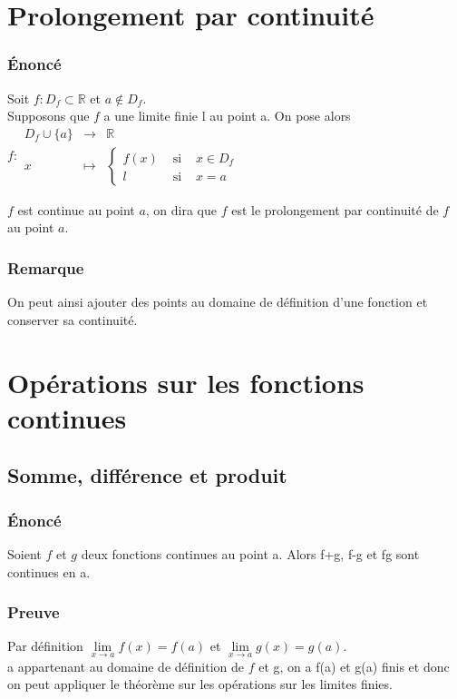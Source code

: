 \documentclass[a4paper,10pt]{book} %
\newcommand{\R}{\mathbb{R}}
\begin{document}
\newpage

\section{Prolongement par continuité}
\subsubsection{Énoncé}
Soit $f:D_{f}\subset \R$ et $a\notin D_{f}$.\\
Supposons que $f$ a une limite finie l au point a. On pose alors $\overset{~}{f}: \begin{array}{rcl} D_{f}\cup \{a\}&\rightarrow& \R \\
x&\mapsto &\left\{ \begin{array}{rcl}
f(x)&\text{ si }& x\in D_{f}\\
l&\text{ si }& x=a
\end{array} \right. \end{array}$

$\overset{~}{f}$ est continue au point $a$, on dira que $\overset{~}{f}$ est le prolongement par continuité de $f$ au point $a$.

\subsubsection{Remarque}
On peut ainsi ajouter des points au domaine de définition d'une fonction et conserver sa continuité.

\section{Opérations sur les fonctions continues}
\subsection{Somme, différence et produit}
\subsubsection{Énoncé}
Soient $f$ et $g$ deux fonctions continues au point a. Alors f+g, f-g et fg sont continues en a.

\subsubsection{Preuve}
Par définition $\lim\limits_{x\rightarrow a} f(x)=f(a)$ et $\lim\limits_{x\rightarrow a} g(x)=g(a)$.\\
a appartenant au domaine de définition de $f$ et g, on a f(a) et g(a) finis et donc on peut appliquer le théorème sur les opérations sur les limites finies.
\end{document}
